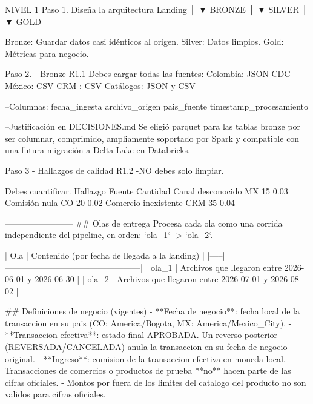 NIVEL 1
Paso 1. Diseña la arquitectura
Landing │ 
▼ BRONZE │ 
▼ SILVER │ 
▼ GOLD

Bronze: Guardar datos casi idénticos al origen.
Silver: Datos limpios.
Gold: Métricas para negocio.

Paso 2. - Bronze
R1.1
Debes cargar todas las fuentes:
Colombia: JSON CDC
México: CSV
CRM : CSV
Catálogos: JSON y CSV

--Columnas:
fecha_ingesta
archivo_origen
pais_fuente
timestamp_procesamiento

--Justificación en DECISIONES.md
Se eligió parquet para las tablas bronze por ser columnar, comprimido, ampliamente soportado por Spark y compatible con una futura migración a Delta Lake en Databricks.

Paso 3 - Hallazgos de calidad
R1.2 -NO debes solo limpiar.

Debes cuantificar.
Hallazgo	Fuente	Cantidad	%
Canal desconocido	MX	15	0.03%
Comisión nula	CO	20	0.02%
Comercio inexistente	CRM	35	0.04%



------------------------
## Olas de entrega
Procesa cada ola como una corrida independiente del pipeline, en orden: `ola_1` -> `ola_2`.

| Ola | Contenido (por fecha de llegada a la landing) |
|-----|------------------------------------------------|
| ola_1 | Archivos que llegaron entre 2026-06-01 y 2026-06-30 |
| ola_2 | Archivos que llegaron entre 2026-07-01 y 2026-08-02 |


## Definiciones de negocio (vigentes)
- **Fecha de negocio**: fecha local de la transaccion en su pais (CO: America/Bogota, MX: America/Mexico_City).
- **Transaccion efectiva**: estado final APROBADA. Un reverso posterior (REVERSADA/CANCELADA) anula la transaccion en su fecha de negocio original.
- **Ingreso**: comision de la transaccion efectiva en moneda local.
- Transacciones de comercios o productos de prueba **no** hacen parte de las cifras oficiales.
- Montos por fuera de los limites del catalogo del producto no son validos para cifras oficiales.